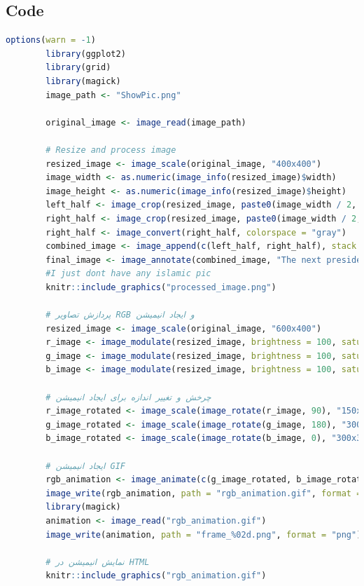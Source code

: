 \documentclass[12pt]{article}
\begin{document}
	\subsection*{Code}
	\begin{lstlisting}[language=R]
		options(warn = -1)
		library(ggplot2)
		library(grid)
		library(magick)
		image_path <- "ShowPic.png"
		
		original_image <- image_read(image_path)
		
		# Resize and process image
		resized_image <- image_scale(original_image, "400x400")
		image_width <- as.numeric(image_info(resized_image)$width)
		image_height <- as.numeric(image_info(resized_image)$height)
		left_half <- image_crop(resized_image, paste0(image_width / 2, "x", image_height, "+0+0"))
		right_half <- image_crop(resized_image, paste0(image_width / 2, "x", image_height, "+", image_width / 2, "+0"))
		right_half <- image_convert(right_half, colorspace = "gray")
		combined_image <- image_append(c(left_half, right_half), stack = FALSE)
		final_image <- image_annotate(combined_image, "The next president of Taiwan", size = 20, gravity = "north", color = "orange", boxcolor = "black")
		#I just dont have any islamic pic
		knitr::include_graphics("processed_image.png")
		
		# پردازش تصاویر RGB و ایجاد انیمیشن
		resized_image <- image_scale(original_image, "600x400")
		r_image <- image_modulate(resized_image, brightness = 100, saturation = 100, hue = 0)
		g_image <- image_modulate(resized_image, brightness = 100, saturation = 100, hue = 120)
		b_image <- image_modulate(resized_image, brightness = 100, saturation = 100, hue = 240)
		
		# چرخش و تغییر اندازه برای ایجاد انیمیشن
		r_image_rotated <- image_scale(image_rotate(r_image, 90), "150x150")
		g_image_rotated <- image_scale(image_rotate(g_image, 180), "300x325")
		b_image_rotated <- image_scale(image_rotate(b_image, 0), "300x325")
		
		# ایجاد انیمیشن GIF
		rgb_animation <- image_animate(c(g_image_rotated, b_image_rotated, r_image_rotated), fps = 1)
		image_write(rgb_animation, path = "rgb_animation.gif", format = "gif")
		library(magick)
		animation <- image_read("rgb_animation.gif")
		image_write(animation, path = "frame_%02d.png", format = "png")
		
		# نمایش انیمیشن در HTML
		knitr::include_graphics("rgb_animation.gif")
		
	\end{lstlisting}
\end{document}
